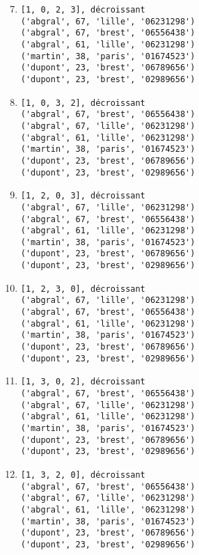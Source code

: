\documentclass[11pt,a4paper]{article}
\begin{document}
\hfill
\begin{minipage}[t]{7cm}\footnotesize
\begin{enumerate}\setcounter{enumi}{6}
\item \begin{Verbatim}
[1, 0, 2, 3], décroissant
('abgral', 67, 'lille', '06231298')
('abgral', 67, 'brest', '06556438')
('abgral', 61, 'lille', '06231298')
('martin', 38, 'paris', '01674523')
('dupont', 23, 'brest', '06789656')
('dupont', 23, 'brest', '02989656')
\end{Verbatim}

\item \begin{Verbatim}
[1, 0, 3, 2], décroissant
('abgral', 67, 'brest', '06556438')
('abgral', 67, 'lille', '06231298')
('abgral', 61, 'lille', '06231298')
('martin', 38, 'paris', '01674523')
('dupont', 23, 'brest', '06789656')
('dupont', 23, 'brest', '02989656')
\end{Verbatim}

\item \begin{Verbatim}
[1, 2, 0, 3], décroissant
('abgral', 67, 'lille', '06231298')
('abgral', 67, 'brest', '06556438')
('abgral', 61, 'lille', '06231298')
('martin', 38, 'paris', '01674523')
('dupont', 23, 'brest', '06789656')
('dupont', 23, 'brest', '02989656')
\end{Verbatim}

\item \begin{Verbatim}
[1, 2, 3, 0], décroissant
('abgral', 67, 'lille', '06231298')
('abgral', 67, 'brest', '06556438')
('abgral', 61, 'lille', '06231298')
('martin', 38, 'paris', '01674523')
('dupont', 23, 'brest', '06789656')
('dupont', 23, 'brest', '02989656')
\end{Verbatim}

\item \begin{Verbatim}
[1, 3, 0, 2], décroissant
('abgral', 67, 'brest', '06556438')
('abgral', 67, 'lille', '06231298')
('abgral', 61, 'lille', '06231298')
('martin', 38, 'paris', '01674523')
('dupont', 23, 'brest', '06789656')
('dupont', 23, 'brest', '02989656')
\end{Verbatim}

\item \begin{Verbatim}
[1, 3, 2, 0], décroissant
('abgral', 67, 'brest', '06556438')
('abgral', 67, 'lille', '06231298')
('abgral', 61, 'lille', '06231298')
('martin', 38, 'paris', '01674523')
('dupont', 23, 'brest', '06789656')
('dupont', 23, 'brest', '02989656')
\end{Verbatim}
\end{enumerate}
\end{minipage}
\end{document}
